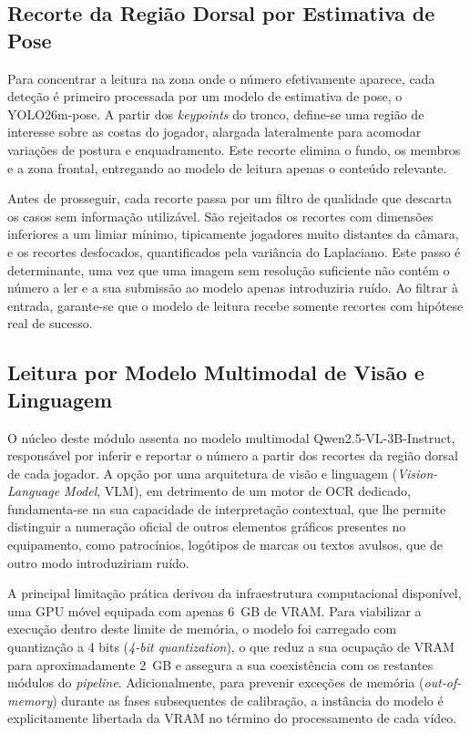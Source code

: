 \subsection{Recorte da Região Dorsal por Estimativa de Pose}

Para concentrar a leitura na zona onde o número efetivamente aparece, cada deteção é primeiro
processada por um modelo de estimativa de pose, o YOLO26m-pose. A partir dos \emph{keypoints} do
tronco, define-se uma região de interesse sobre as costas do jogador, alargada lateralmente para
acomodar variações de postura e enquadramento. Este recorte elimina o fundo, os membros e a zona
frontal, entregando ao modelo de leitura apenas o conteúdo relevante.

Antes de prosseguir, cada recorte passa por um filtro de qualidade que descarta os casos sem
informação utilizável. São rejeitados os recortes com dimensões inferiores a um limiar mínimo,
tipicamente jogadores muito distantes da câmara, e os recortes desfocados, quantificados pela
variância do Laplaciano. Este passo é determinante, uma vez que uma imagem sem resolução
suficiente não contém o número a ler e a sua submissão ao modelo apenas introduziria ruído. Ao
filtrar à entrada, garante-se que o modelo de leitura recebe somente recortes com hipótese real
de sucesso.

\subsection{Leitura por Modelo Multimodal de Visão e Linguagem}

O núcleo deste módulo assenta no modelo multimodal Qwen2.5-VL-3B-Instruct, responsável por
inferir e reportar o número a partir dos recortes da região dorsal de cada jogador. A opção por
uma arquitetura de visão e linguagem (\emph{Vision-Language Model}, VLM), em detrimento de um
motor de OCR dedicado, fundamenta-se na sua capacidade de interpretação contextual, que lhe
permite distinguir a numeração oficial de outros elementos gráficos presentes no equipamento,
como patrocínios, logótipos de marcas ou textos avulsos, que de outro modo introduziriam ruído.

A principal limitação prática derivou da infraestrutura computacional disponível, uma GPU móvel
equipada com apenas 6~GB de VRAM. Para viabilizar a execução dentro deste limite de memória, o
modelo foi carregado com quantização a 4 bits (\emph{4-bit quantization}), o que reduz a sua
ocupação de VRAM para aproximadamente 2~GB e assegura a sua coexistência com os restantes
módulos do \emph{pipeline}. Adicionalmente, para prevenir exceções de memória (\emph{out-of-memory})
durante as fases subsequentes de calibração, a instância do modelo é explicitamente libertada da
VRAM no término do processamento de cada vídeo.

